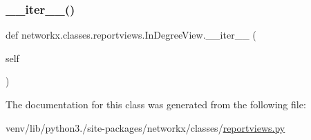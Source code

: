 \mbox{\label{classnetworkx_1_1classes_1_1reportviews_1_1InDegreeView_a4b8f387220e76c2d985cfede049da404}} 
\subsubsection{\texorpdfstring{\+\_\+\+\_\+iter\+\_\+\+\_\+()}{\_\_iter\_\_()}}
{\footnotesize\ttfamily def networkx.\+classes.\+reportviews.\+In\+Degree\+View.\+\_\+\+\_\+iter\+\_\+\+\_\+ (\begin{DoxyParamCaption}\item[{}]{self }\end{DoxyParamCaption})}



The documentation for this class was generated from the following file\+:\begin{DoxyCompactItemize}
\item 
venv/lib/python3./site-\/packages/networkx/classes/\hyperlink{reportviews_8py}{reportviews.\+py}\end{DoxyCompactItemize}
